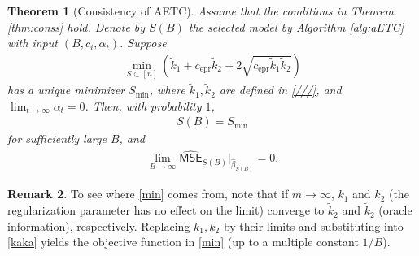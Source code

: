 \documentclass[a4paper,11pt]{article}
\numberwithin{equation}{section}
\theoremstyle{plain}
\newtheorem{Th}{Theorem}[section]
\theoremstyle{definition}
\newtheorem{Rem}[Th]{Remark}
\def\ex{{\text{epr}}}
\def\mse{{\textsf{MSE}}}
\def\lrmc{{\textsf{LRMC}}}
\DeclareMathOperator*{\argmin}{arg\,min}
\begin{document}
\begin{Th}[Consistency of AETC]\label{thm:AETC}
Assume that the conditions in Theorem \ref{thm:conss} hold.
Denote by $S(B)$ the selected model by Algorithm \ref{alg:aETC} with input $(B, c_i,\alpha_t)$.
Suppose 
\begin{align}
\min_{S\subset [n]}\left(\tilde{k}_1+c_{\ex}\tilde{k}_2+2\sqrt{c_{\ex}\tilde{k}_1\tilde{k}_2}\right)\label{min}
\end{align}
has a unique minimizer $S_{\min}$, where $\tilde{k}_1, \tilde{k}_2$ are defined in \eqref{///},  
and $\lim_{t\to\infty}\alpha_t = 0$.  
Then, with probability $1$, 
\begin{align}
S(B) = S_{\min}\label{rr1}
\end{align}
for sufficiently large $B$, and 
\begin{align}
\lim_{B\to\infty}\widehat{\mse}_{S(B)}|_{\widehat{\beta}_{S(B)}} = 0.\label{rr2}
\end{align} 
\end{Th}

\begin{Rem}\label{need}
To see where \eqref{min} comes from, note that if $m\to\infty$, $k_1$ and $k_2$ (the regularization parameter has no effect on the limit) converge to $\tilde{k}_2$ and $\tilde{k}_2$ (oracle information), respectively. Replacing $k_1, k_2$ by their limits and substituting into \eqref{kaka} yields
the objective function in \eqref{min} (up to a multiple constant $1/B$).  
\end{Rem}
\end{document}
